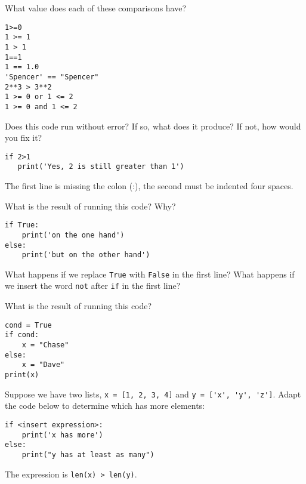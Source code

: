 \documentclass[11pt]{exam}
\begin{document}
\begin{questions}
\item What value does each of these comparisons have?
\begin{verbatim}
1>=0
1 >= 1
1 > 1
1==1
1 == 1.0
'Spencer' == "Spencer"
2**3 > 3**2
1 >= 0 or 1 <= 2
1 >= 0 and 1 <= 2
\end{verbatim}

\item  Does this code run without error?  If so, what does it produce?  If not, how would you fix it?
\begin{verbatim}
if 2>1
   print('Yes, 2 is still greater than 1')
\end{verbatim}

\begin{solution}
The first line is missing the colon (:), the second must be indented four spaces.
\end{solution}

\item What is the result of running this code?  Why?
\begin{verbatim}
if True:
    print('on the one hand')
else:
    print('but on the other hand')
\end{verbatim}
What happens if we replace {\tt True} with {\tt False} in the first line?
What happens if we insert the word {\tt not} after {\tt if} in the first line?

\item What is the result of running this code?
\begin{verbatim}
cond = True
if cond:
    x = "Chase"
else:
    x = "Dave"
print(x)
\end{verbatim}

\item Suppose we have two lists,
{\tt x = [1, 2, 3, 4]} and \verb|y = ['x', 'y', 'z']|.
Adapt the code below to determine which has more elements:
\begin{verbatim}
if <insert expression>:
    print('x has more')
else:
    print("y has at least as many")
\end{verbatim}

\begin{solution}
The expression is \verb|len(x) > len(y)|.
\end{solution}




\end{questions}
\end{document}

